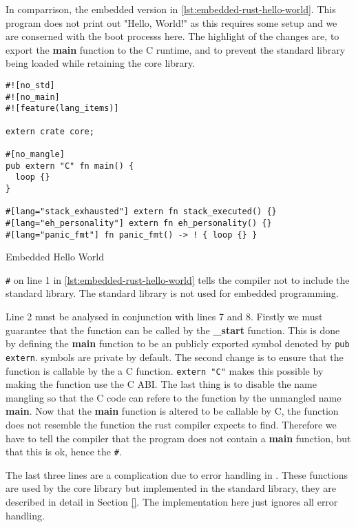 In comparrison, the embedded version in \autoref{lst:embedded-rust-hello-world}.
This program does not print out "Hello, World!" as this requires some setup and we are conserned with the boot processs here.
The highlight of the changes are, to export the \textbf{main} function to the C runtime, and to prevent the standard library being loaded while retaining the core library.

\begin{listing}[H]
\begin{verbatim}
#![no_std]
#![no_main]
#![feature(lang_items)]

extern crate core;

#[no_mangle]
pub extern "C" fn main() {
  loop {}
}

#[lang="stack_exhausted"] extern fn stack_executed() {}
#[lang="eh_personality"] extern fn eh_personality() {}
#[lang="panic_fmt"] fn panic_fmt() -> ! { loop {} }
\end{verbatim}
\caption{Embedded Hello World}
\label{lst:embedded-rust-hello-world}
\end{listing}

\texttt{\#\![no\_std]} on line 1 in \autoref{lst:embedded-rust-hello-world} tells the \rust compiler not to include the standard library.
The standard library is not used for embedded programming. 

Line 2 must be analysed in conjunction with lines 7 and 8.
Firstly we must guarantee that the function can be called by the \textbf{\_start} function.
This is done by defining the \textbf{main} function to be an publicly exported symbol denoted by \texttt{pub extern}.
\rust symbols are private by default.
The second change is to ensure that the function is callable by the a C function.
\texttt{extern "C"} makes this possible by making the function use the C ABI. 
The last thing is to disable the \rust name mangling so that the C code can refere to the function by the unmangled name \textbf{main}.
Now that the \textbf{main} function is altered to be callable by C, the function does not resemble the function the rust compiler expects to find.
Therefore we have to tell the compiler that the program does not contain a \textbf{main} function, but that this is ok, hence the \texttt{\#\![no\_main]}.

The last three lines are a complication due to error handling in \rust.
These functions are used by the core library but implemented in the standard library, they are described in detail in Section \ref{}. 
The implementation here just ignores all error handling.

